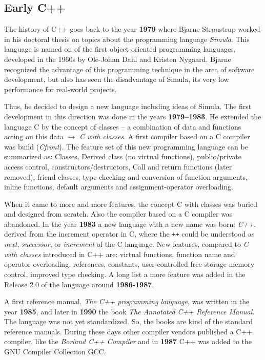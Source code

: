 \subsection{Early C++}
The history of C++ goes back to the year \textbf{1979} where Bjarne Stroustrup worked in his doctoral thesis on topics about the
programming language \emph{Simula}. This language is named on of the first object-oriented programming languages, developed in the
1960s by Ole-Johan Dahl and Kristen Nygaard. Bjarne recognized the advantage of this programming technique in the area of software
development, but also has seen the disadvantage of Simula, its very low performance for real-world projects.

Thus, he decided to design a new language including ideas of Simula. The first development in this direction was done in the years
\textbf{1979--1983}. He extended the language C by the concept of classes -- a combination of data and functions acting on this data
$\rightarrow$ \textit{C with classes}. A first compiler based on a C compiler was build (\textit{Cfront}). The feature set of this new
programming language can be summarized as: Classes, Derived class (no virtual functions), public/private access control,
constructors/destructors, Call and return functions (later removed), friend classes, type checking and conversion of function arguments,
inline functions, default arguments and assignment-operator overloading.

When it came to more and more features, the concept C with classes was buried and designed from scratch. Also the compiler based on a C compiler
was abandoned. In the year \textbf{1983} a new language with a new name was born: \textit{C++}, derived from the increment operator in C,
where the \texttt{++} could be understood as \emph{next}, \emph{successor}, or \emph{increment} of the C language. New features, compared
to \emph{C with classes} introduced in C++ are: virtual functions, function name and operator overloading, references, constants,
user-controlled free-storage memory control, improved type checking. A long list a more feature was added in the Release 2.0 of the language
around \textbf{1986-1987}.

A first reference manual, \textit{The C++ programming language}, was written in the year \textbf{1985}, and later in \textbf{1990} the book
\textit{The Annotated C++ Reference Manual}. The language was not yet standardized. So, the books are kind of the standard reference manuals.
During these days other compiler vendors published a C++ compiler, like  the \textit{Borland C++ Compiler} and in \textbf{1987} C++ was added
to the GNU Compiler Collection GCC.

